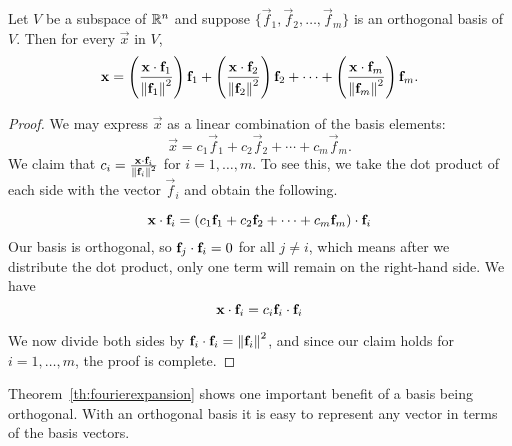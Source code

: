 \documentclass{ximera}
\begin{document}
\begin{theorem}\label{th:fourierexpansion}
Let $V$ be a subspace of $\mathbb{R}^n$ and suppose $\{ \vec{f}_1, \vec{f}_2, \ldots, \vec{f}_m \}$
is an orthogonal basis of $V$.
Then for every $\vec{x}$ in $V$,
\begin{equation}
\mathbf{x} =
\left(\frac{\mathbf{x}\cdot \mathbf{f}_1}{\left\lVert\mathbf{f}_1\right\rVert^2}\right) \mathbf{f}_1 +
\left(\frac{\mathbf{x}\cdot \mathbf{f}_2}{\left\lVert\mathbf{f}_2\right\rVert^2}\right) \mathbf{f}_2 +
\cdots +
\left(\frac{\mathbf{x}\cdot \mathbf{f}_m}{\left\lVert\mathbf{f}_m\right\rVert^2}\right) \mathbf{f}_m.
\end{equation}\label{FourierEqn}
\end{theorem}

\begin{proof}
We may express $\vec{x}$ as a linear combination of the basis elements:
\[ \vec{x} =
c_1 \vec{f}_1 +
c_2 \vec{f}_2 +
\cdots +
c_m \vec{f}_m.
\]
We claim that $c_i = \frac{\mathbf{x}\cdot \mathbf{f}_i}{\left\lVert\mathbf{f}_i\right\rVert^2}$ for $i=1,\ldots,m$. To see this, we take the dot product of
each side with the vector $\vec{f}_i$ and obtain the following.

\begin{equation*}
  \mathbf{x} \cdot \mathbf{f}_i =  \left(c_1\mathbf{f}_1 +
c_2\mathbf{f}_2 +
\cdots +
c_m\mathbf{f}_m\right) \cdot \mathbf{f}_i 
\end{equation*}
Our basis is orthogonal, so $\mathbf{f}_j \cdot \mathbf{f}_i = 0$ for all $j \neq i$, which means after we distribute the dot product, only one term will remain on the right-hand side.  We have 
\begin{equation*}
  \mathbf{x} \cdot \mathbf{f}_i =  c_i\mathbf{f}_i \cdot \mathbf{f}_i 
\end{equation*}

We now divide both sides by $\mathbf{f}_i \cdot \mathbf{f}_i = \left\lVert\mathbf{f}_i\right\rVert^2$, and since our claim holds for $i=1,\ldots,m$, the proof is complete.
\end{proof}

Theorem~\ref{th:fourierexpansion} shows one important benefit of a basis being orthogonal.  With an orthogonal basis it is easy to represent any vector in terms of the basis vectors.  
\end{document}
